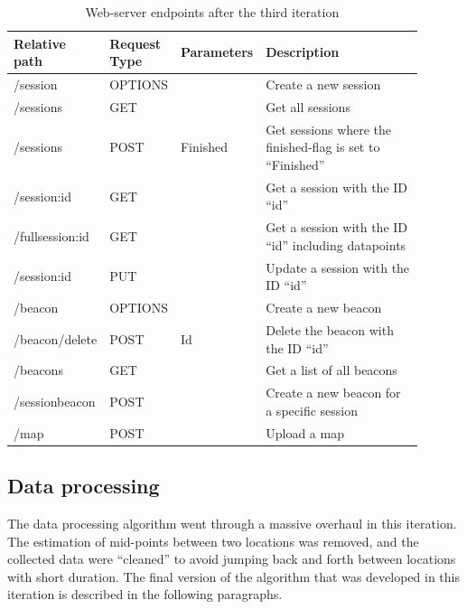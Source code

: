 \documentclass[../Main/thesis.tex]{subfiles}
\begin{document}
\begin{table}[h]
\caption{Web-server endpoints after the third iteration}
\begin{tabular}{|p{0.2\linewidth}|p{0.15\linewidth}|p{0.15\linewidth}|p{0.4\linewidth}|}
\hline
\textbf{Relative path} & \textbf{Request Type} & \textbf{Parameters} & \textbf{Description}                                        \\ \hline
/session               & OPTIONS               &                     & Create a new session                                        \\ \hline
/sessions              & GET                   &                     & Get all sessions                                            \\ \hline
/sessions              & POST                  & Finished            & Get sessions where the finished-flag is set to ``Finished'' \\ \hline
/session:id            & GET                   &                     & Get a session with the ID ``id''                            \\ \hline
/fullsession:id        & GET                   &                     & Get a session with the ID ``id'' including datapoints       \\ \hline
/session:id            & PUT                   &                     & Update a session with the ID ``id''                         \\ \hline
/beacon                & OPTIONS               &                     & Create a new beacon                                         \\ \hline
/beacon/delete         & POST                  & Id                  & Delete the beacon with the ID ``id''                        \\ \hline
/beacons               & GET                   &                     & Get a list of all beacons                                   \\ \hline
/sessionbeacon         & POST                  &                     & Create a new beacon for a specific session                  \\ \hline
/map                   & POST                  &                     & Upload a map                                                \\ \hline
\end{tabular}
\label{tab:endpoints-2}
\end{table}

\subsection{Data processing}
The data processing algorithm went through a massive overhaul in this iteration.
The estimation of mid-points between two locations was removed, and the collected data were ``cleaned'' to avoid jumping back and forth between locations with short duration. 
The final version of the algorithm that was developed in this iteration is described in the following paragraphs.
\end{document}
